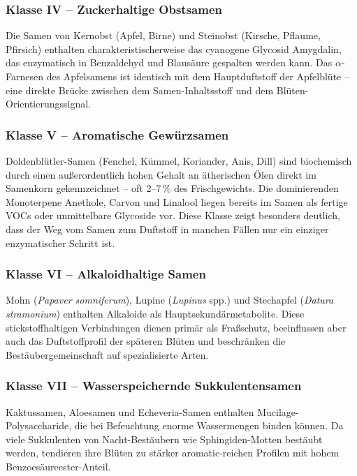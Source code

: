 ﻿\documentclass[12pt,a4paper]{article}
\begin{document}
\subsubsection{Klasse IV -- Zuckerhaltige Obstsamen}

Die Samen von Kernobst (Apfel, Birne) und Steinobst (Kirsche, Pflaume, Pfirsich) enthalten charakteristischerweise das cyanogene Glycosid Amygdalin, das enzymatisch in Benzaldehyd und Blaus\"aure gespalten werden kann. Das $\alpha$-Farnesen des Apfelsamens ist identisch mit dem Hauptduftstoff der Apfelbl\"ute -- eine direkte Br\"ucke zwischen dem Samen-Inhaltsstoff und dem Bl\"uten-Orientierungssignal.

\subsubsection{Klasse V -- Aromatische Gew\"urzsamen}

Doldenbl\"utler-Samen (Fenchel, K\"ummel, Koriander, Anis, Dill) sind biochemisch durch einen au{\ss}erordentlich hohen Gehalt an \"atherischen \"Olen direkt im Samenkorn gekennzeichnet -- oft 2--7\,\% des Frischgewichts. Die dominierenden Monoterpene Anethole, Carvon und Linalool liegen bereits im Samen als fertige VOCs oder unmittelbare Glycoside vor. Diese Klasse zeigt besonders deutlich, dass der Weg vom Samen zum Duftstoff in manchen F\"allen nur ein einziger enzymatischer Schritt ist.

\subsubsection{Klasse VI -- Alkaloidhaltige Samen}

Mohn (\textit{Papaver somniferum}), Lupine (\textit{Lupinus} spp.) und Stechapfel (\textit{Datura stramonium}) enthalten Alkaloide als Hauptsekund\"armetabolite. Diese stickstoffhaltigen Verbindungen dienen prim\"ar als Fra{\ss}schutz, beeinflussen aber auch das Duftstoffprofil der sp\"ateren Bl\"uten und beschr\"anken die Best\"aubergemeinschaft auf spezialisierte Arten.

\subsubsection{Klasse VII -- Wasserspeichernde Sukkulentensamen}

Kaktussamen, Aloesamen und Echeveria-Samen enthalten Mucilage-Polysaccharide, die bei Befeuchtung enorme Wassermengen binden k\"onnen. Da viele Sukkulenten von Nacht-Best\"aubern wie Sphingiden-Motten best\"aubt werden, tendieren ihre Bl\"uten zu st\"arker aromatic-reichen Profilen mit hohem Benzoes\"aureester-Anteil.
\end{document}
